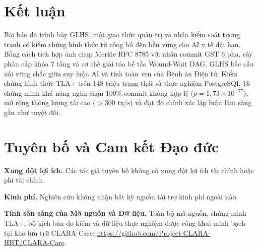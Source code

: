 \documentclass[11pt,a4paper]{article}
\begin{document}
\section{Kết luận}
Bài báo đã trình bày GLHS, một giao thức quản trị và nhân kiểm soát tương tranh có kiểm chứng hình thức từ công bố đến bền vững cho AI y tế dài hạn. Bằng cách tích hợp ảnh chụp Merkle RFC 8785 với nhân commit GST 6 pha, cây phân cấp khóa 7 tầng và cơ chế giải tỏa bế tắc Wound-Wait DAG, GLHS bắc cầu nối vững chắc giữa suy luận AI và tính toàn vẹn của Bệnh án Điện tử. Kiểm chứng hình thức TLA+ trên 148 triệu trạng thái và thực nghiệm PostgreSQL 16 chứng minh khả năng ngăn chặn 100\% commit không hợp lệ ($p = 1{,}73 \times 10^{-77}$), mở rộng thông lượng tải cao ($>300\text{ tx/s}$) và đạt độ chính xác lập luận lâm sàng gần như tuyệt đối.

\section*{Tuyên bố và Cam kết Đạo đức}
\textbf{Xung đột lợi ích.} Các tác giả tuyên bố không có xung đột lợi ích tài chính hoặc phi tài chính.

\textbf{Kinh phí.} Nghiên cứu không nhận bất kỳ nguồn tài trợ kinh phí ngoài nào.

\textbf{Tính sẵn sàng của Mã nguồn và Dữ liệu.} Toàn bộ mã nguồn, chứng minh TLA+, bộ kịch bản đo kiểm và dữ liệu thực nghiệm được công khai minh bạch tại kho lưu trữ CLARA-Care: \url{https://github.com/Project-CLARA-HBT/CLARA-Care}.
\end{document}
